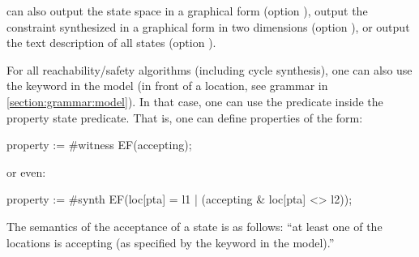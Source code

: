 \imitator{} can also
output the state space in a graphical form (option ),
output the constraint synthesized in a graphical form in two dimensions (option ),
or
output the text description of all states (option ).


\begin{remark}\label{remark:accepting}
	For all reachability/safety algorithms (including cycle synthesis), one can also use the  keyword in the model (in front of a location, see grammar in \cref{section:grammar:model}).
	In that case, one can use the  predicate inside the property state predicate.
	That is, one can define properties of the form:

\begin{IMITATORproperty}
property := #witness EF(accepting);
\end{IMITATORproperty}

	or even:

\begin{IMITATORproperty}
property := #synth EF(loc[pta] = l1 | (accepting & loc[pta] <> l2));
\end{IMITATORproperty}

	The semantics of the acceptance of a state is as follows: ``at least one of the locations is accepting (as specified by the  keyword in the model).''

%
\end{remark}

%
%
%
%



